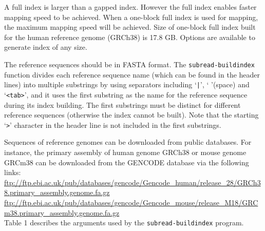 \documentclass[12pt]{report}
\newcommand{\code}[1]{{\small\texttt{#1}}}
\begin{document}
A full index is larger than a gapped index.
However the full index enables faster mapping speed to be achieved.
When a one-block full index is used for mapping, the maximum mapping speed will be achieved.
Size of one-block full index built for the human reference genome (GRCh38) is 17.8 GB.
Options are available to generate index of any size.

The reference sequences should be in FASTA format.
The \code{subread-buildindex} function divides each reference sequence name (which can be found in the header lines) into multiple substrings by using separators including `\code{|}', ` '(space) and `\code{<tab>}', and it uses the first substring as the name for the reference sequence during its index building.
The first substrings must be distinct for different reference sequences (otherwise the index cannot be built).
Note that the starting `\code{>}' character in the header line is not included in the first substrings.

Sequences of reference genomes can be downloaded from public databases.
For instance, the primary assembly of human genome GRCh38 or mouse genome GRCm38 can be downloaded from the GENCODE database via the following links:\\

\noindent\href{ftp://ftp.ebi.ac.uk/pub/databases/gencode/Gencode_human/release_28/GRCh38.primary_assembly.genome.fa.gz}{\color{blue}\url{ftp://ftp.ebi.ac.uk/pub/databases/gencode/Gencode_human/release_28/GRCh38.primary_assembly.genome.fa.gz}}\\

\noindent\href{ftp://ftp.ebi.ac.uk/pub/databases/gencode/Gencode_mouse/release_M18/GRCm38.primary_assembly.genome.fa.gz}{\color{blue}\url{ftp://ftp.ebi.ac.uk/pub/databases/gencode/Gencode_mouse/release_M18/GRCm38.primary_assembly.genome.fa.gz}}\\

Table 1 describes the arguments used by the \code{subread-buildindex} program.

\newpage
\end{document}
